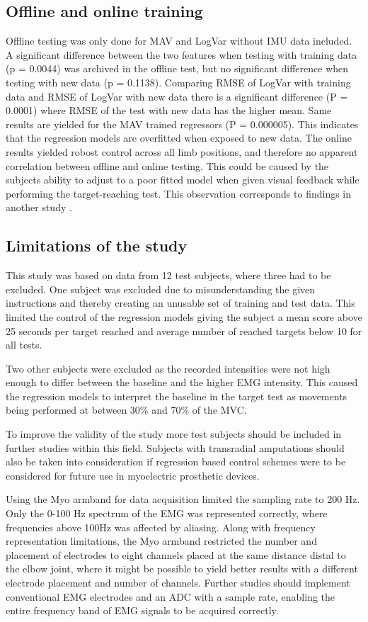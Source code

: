 \subsection{Offline and online training}
Offline testing was only done for MAV and LogVar without IMU data included. A significant difference between the two features when testing with training data (p = 0.0044) was archived in the offline test, but no significant difference when testing with new data (p = 0.1138). Comparing RMSE of LogVar with training data and RMSE of LogVar with new data there is a significant difference (P = 0.0001) where RMSE of the test with new data has the higher mean. Same results are yielded for the MAV trained regressors (P = 0.000005). This indicates that the regression models are overfitted when exposed to new data. The online results yielded robost control across all limb positions, and therefore no apparent correlation between offline and online testing. This could be caused by the subjects ability to adjust to a poor fitted model when given visual feedback while performing the target-reaching test. This observation corresponds to findings in another study \cite{jiang2010}.


\subsection{Limitations of the study}
This study was based on data from 12 test subjects, where three had to be excluded. One subject was excluded due to misunderstanding the given instructions and thereby creating an unusable set of training and test data. This limited the control of the regression models giving the subject a mean score above 25 seconds per target reached and average number of reached targets below 10 for all tests.

Two other subjects were excluded as the recorded intensities were not high enough to differ between the baseline and the higher EMG intensity. This caused the regression models to interpret the baseline in the target test as movements being performed at between 30\% and 70\% of the MVC. 

To improve the validity of the study more test subjects should be included in further studies within this field. Subjects with transradial amputations should also be taken into consideration if regression based control schemes were to be considered for future use in myoelectric prosthetic devices. 

Using the Myo armband for data acquisition limited the sampling rate to 200 Hz. Only the 0-100 Hz spectrum of the EMG was represented correctly, where frequencies above 100Hz was affected by aliasing. Along with frequency representation limitations, the Myo armband restricted the number and placement of electrodes to eight channels placed at the same distance distal to the elbow joint, where it might be possible to yield better results with a different electrode placement and number of channels. Further studies should implement conventional EMG electrodes and an ADC with a sample rate, enabling the entire frequency band of EMG signals to be acquired correctly.


